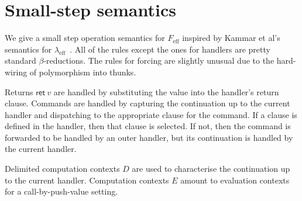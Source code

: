\documentclass[preprint]{sigplanconf}
\newcommand{\lameff}{$\lambda_\mathrm{eff}$\xspace}
\newcommand{\feff}{$F_\textrm{eff}$\xspace}
\newcommand{\key}[1]{\mathsf{#1}}
\begin{document}
\section{Small-step semantics}
\label{sec:semantics}

We give a small step operation semantics for \feff inspired by Kammar
et al's semantics for \lameff~\cite{KammarLO13}.
%
All of the rules except the ones for handlers are pretty standard
$\beta$-reductions.
%
The rules for forcing are slightly unusual due to the hard-wiring of
polymorphism into thunks.

Returns $\key{ret}~v$ are handled by substituting the value into the
handler's return clause. Commands are handled by capturing the
continuation up to the current handler and dispatching to the
appropriate clause for the command. If a clause is defined in the
handler, then that clause is selected. If not, then the command is
forwarded to be handled by an outer handler, but its continuation is
handled by the current handler.

Delimited computation contexts $D$ are used to characterise the
continuation up to the current handler. Computation contexts $E$
amount to evaluation contexts for a call-by-push-value setting.
\end{document}
